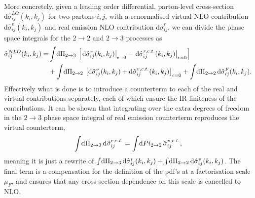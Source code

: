 \documentclass[../main.tex]{subfiles}
\begin{document}
More concretely, given a leading order differential, parton-level cross-section \(\mathrm{d}\hat\sigma_{ij}^{LO}(k_i, k_j)\) for two partons \(i,j\), with a renormalised virtual NLO contribution \(\mathrm{d}\hat\sigma_{ij}^v(k_i, k_j)\) and real emission NLO contribution \(\mathrm{d}\hat\sigma_{ij}^r\), we can divide the phase space integrals for the \(2 \to 2\) and \(2 \to 3\) processes as
\begin{align}
  \nonumber
  \hat\sigma_{ij}^{NLO}(k_i, k_j) = & \int \!\mathrm{d}\Pi_{2\to 3}\, \left[\left.\mathrm{d}\hat\sigma_{ij}^r(k_i,k_j)\right|_{\epsilon=0} - \left.\mathrm{d}\hat\sigma_{ij}^{r, c.t.}(k_i,k_j)\right|_{{\epsilon=0}}\right]                                         \\
                                    & + \int \!\mathrm{d}\Pi_{2\to 2}\, \left[\mathrm{d}\hat\sigma_{ij}^v(k_i,k_j) + \mathrm{d}\hat\sigma_{ij}^{v, c.t.}(k_i,k_j)\right]_{\epsilon = 0} + \int \!\mathrm{d}\Pi_{2\to 2}\, \mathrm{d}\hat\sigma_{ij}^{F}(k_i, k_j).
\end{align}
Effectively what is done is to introduce a counterterm to each of the real and virtual contributions separately, each of which ensure the IR finiteness of the contributions.
It can be shown that integrating over the extra degrees of freedom in the \(2 \to 3\) phase space integral of real emission counterterm reproduces the virtual counterterm,
\begin{align}
  \int \!\mathrm{d}\Pi_{2\to 3}\, \mathrm{d}\hat\sigma_{ij}^{r,c.t.} = \int \!\mathrm{d}Pi_{2 \to 2}\, \hat\sigma_{ij}^{v,c.t.},
\end{align}
meaning it is just a rewrite of \(\int \!\mathrm{d}\Pi_{2 \to 3}\, \mathrm{d}\hat\sigma_{ij}^r(k_i,k_j) + \int \!\mathrm{d}\Pi_{2 \to 2}\, \mathrm{d}\hat\sigma_{ij}^v(k_i,k_j)\).
The final term is a compensation for the definition of the pdf's at a factorisation scale \(\mu_F\), and ensures that any cross-section dependence on this scale is cancelled to NLO\@.
\end{document}
